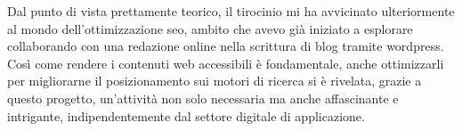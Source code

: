 \vspace{10pt}
\noindent Dal punto di vista prettamente teorico, il tirocinio mi ha avvicinato ulteriormente al mondo dell’ottimizzazione \gls{seo}, ambito che avevo già iniziato a esplorare collaborando con una redazione online nella scrittura di blog tramite \gls{wordpress}. Così come rendere i contenuti web accessibili è fondamentale, anche ottimizzarli per migliorarne il posizionamento sui motori di ricerca si è rivelata, grazie a questo progetto, un’attività non solo necessaria ma anche affascinante e intrigante, indipendentemente dal settore digitale di applicazione.
